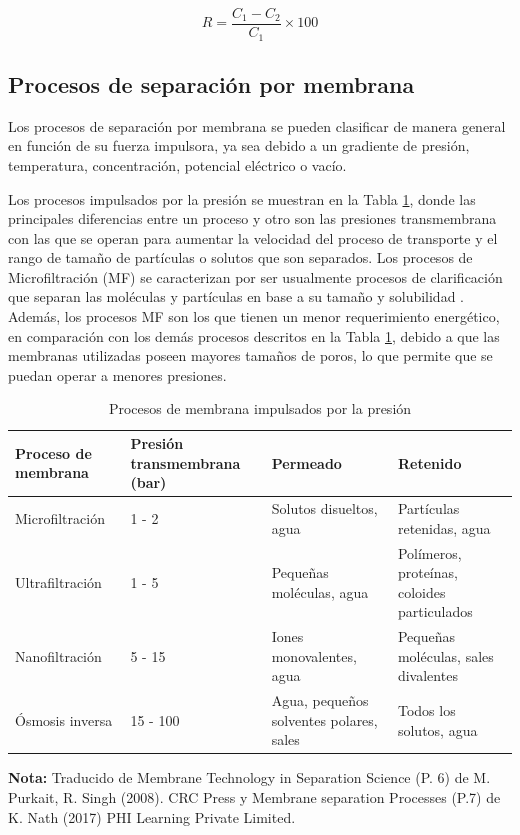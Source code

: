 \begin{equation}
R = \frac{C_1 - C_2}{C_1} \times 100
\label{eq:RechazoMembrana}
\end{equation}

\subsection{Procesos de separación por membrana}
Los procesos de separación por membrana se pueden clasificar de manera general en función de su fuerza impulsora, ya sea debido a un gradiente de presión, temperatura, concentración, potencial eléctrico o vacío.

Los procesos impulsados por la presión se muestran en la Tabla \ref{tab:procesos de membrana}, donde las principales diferencias entre un proceso y otro son las presiones transmembrana con las que se operan para aumentar la velocidad del proceso de transporte y el rango de tamaño de partículas o solutos que son separados. Los procesos de Microfiltración (MF) se caracterizan por ser usualmente procesos de clarificación que separan las moléculas y partículas en base a su tamaño y solubilidad \parencite[p~7]{Nath2017}. Además, los procesos MF son los que tienen un menor requerimiento energético, en comparación con los demás procesos descritos en la Tabla \ref{tab:procesos de membrana}, debido a que las membranas utilizadas poseen mayores tamaños de poros, lo que permite que se puedan operar a menores presiones.


\begin{table}[ht]
\small    
\caption{Procesos de membrana impulsados por la presión}
    \centering
    \begin{tabular}{p{4cm} p{4cm} p{4cm} p{4cm}}
         \toprule
        Proceso de membrana & Presión transmembrana (bar) & Permeado & Retenido \\
         \midrule
        Microfiltración & 1 - 2 & Solutos disueltos, agua & Partículas retenidas, agua \\
        Ultrafiltración & 1 - 5 & Pequeñas moléculas, agua & Polímeros, proteínas, coloides particulados \\
        Nanofiltración & 5 - 15 & Iones monovalentes, agua & Pequeñas moléculas, sales divalentes \\
        Ósmosis inversa & 15 - 100 & Agua, pequeños solventes polares, sales & Todos los solutos, agua \\
         \bottomrule
    \end{tabular}
    \label{tab:procesos de membrana}
\end{table}
\small \textbf{Nota:} Traducido de Membrane Technology in Separation Science (P. 6) de M. Purkait, R. Singh (2008). CRC Press y Membrane separation Processes (P.7) de K. Nath (2017) PHI Learning Private Limited.
